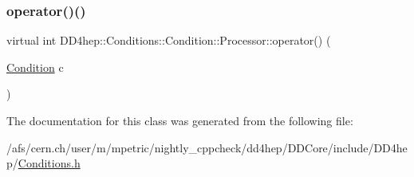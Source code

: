 \subsubsection{\texorpdfstring{operator()()}{operator()()}}
{\footnotesize\ttfamily virtual int D\+D4hep\+::\+Conditions\+::\+Condition\+::\+Processor\+::operator() (\begin{DoxyParamCaption}\item[{\hyperlink{class_d_d4hep_1_1_conditions_1_1_condition}{Condition}}]{c }\end{DoxyParamCaption})\hspace{0.3cm}{\ttfamily [pure virtual]}}



The documentation for this class was generated from the following file\+:\begin{DoxyCompactItemize}
\item 
/afs/cern.\+ch/user/m/mpetric/nightly\+\_\+cppcheck/dd4hep/\+D\+D\+Core/include/\+D\+D4hep/\hyperlink{_conditions_8h}{Conditions.\+h}\end{DoxyCompactItemize}

